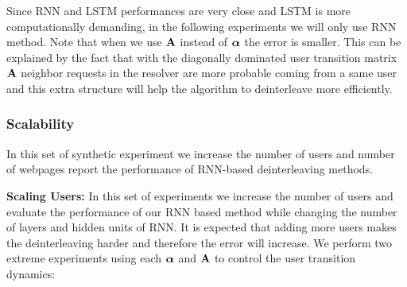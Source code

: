 	
	Since RNN and LSTM performances are very close and LSTM is more computationally demanding, in the following experiments we will only use RNN method. 
	Note that when we use $\mathbf{A}$ instead of $\boldsymbol{\alpha}$ the error is smaller. 
	This can be explained by the fact that with the diagonally dominated user transition matrix $\mathbf{A}$ neighbor requests in the resolver are more probable coming from a same user and this extra structure will help the algorithm to deinterleave more efficiently. 
	
	
	
	\subsubsection{Scalability}
	In this set of synthetic experiment we increase the number of users and number of webpages report the performance of RNN-based deinterleaving methods. 

	{\bf Scaling Users:}
	\label{subsub:scalseusr}
	In this set of experiments we increase the number of users and evaluate the performance of our RNN based method while changing the number of layers and hidden units of RNN. 
	It is expected that adding more users makes the deinterleaving harder and therefore the error will increase. 
	We perform two extreme experiments using each $\boldsymbol{\alpha}$ and $\mathbf{A}$ to control the user transition dynamics: 
	

